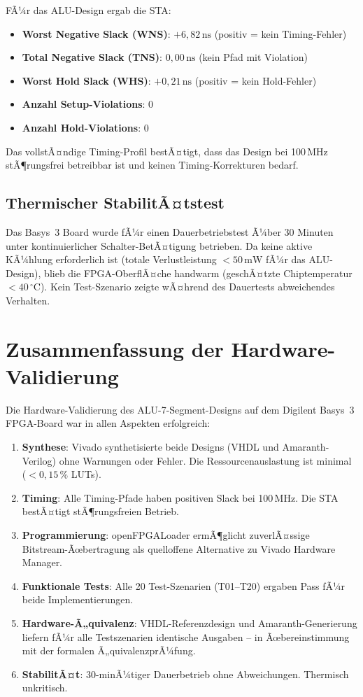 ﻿\documentclass[12pt,a4paper]{report}
\begin{document}
FÃ¼r das ALU-Design ergab die STA:
\begin{itemize}
  \item \textbf{Worst Negative Slack (WNS)}: $+6{,}82\,\text{ns}$ (positiv = kein Timing-Fehler)
  \item \textbf{Total Negative Slack (TNS)}: $0{,}00\,\text{ns}$ (kein Pfad mit Violation)
  \item \textbf{Worst Hold Slack (WHS)}: $+0{,}21\,\text{ns}$ (positiv = kein Hold-Fehler)
  \item \textbf{Anzahl Setup-Violations}: 0
  \item \textbf{Anzahl Hold-Violations}: 0
\end{itemize}

Das vollstÃ¤ndige Timing-Profil bestÃ¤tigt, dass das Design bei 100\,MHz stÃ¶rungsfrei betreibbar ist und keinen Timing-Korrekturen bedarf.

\subsection{Thermischer StabilitÃ¤tstest}
\label{subsec:thermisch}

Das Basys~3 Board wurde fÃ¼r einen Dauerbetriebstest Ã¼ber 30 Minuten unter kontinuierlicher Schalter-BetÃ¤tigung betrieben. Da keine aktive KÃ¼hlung erforderlich ist (totale Verlustleistung $< 50\,\text{mW}$ fÃ¼r das ALU-Design), blieb die FPGA-OberflÃ¤che handwarm (geschÃ¤tzte Chiptemperatur $< 40\,^{\circ}\text{C}$). Kein Test-Szenario zeigte wÃ¤hrend des Dauertests abweichendes Verhalten.

\section{Zusammenfassung der Hardware-Validierung}
\label{sec:hw_zusammenfassung}

Die Hardware-Validierung des ALU-7-Segment-Designs auf dem Digilent Basys~3 FPGA-Board war in allen Aspekten erfolgreich:

\begin{enumerate}
  \item \textbf{Synthese}: Vivado synthetisierte beide Designs (VHDL und Amaranth-Verilog) ohne Warnungen oder Fehler. Die Ressourcenauslastung ist minimal ($< 0{,}15\,\%$ LUTs).
  \item \textbf{Timing}: Alle Timing-Pfade haben positiven Slack bei 100\,MHz. Die STA bestÃ¤tigt stÃ¶rungsfreien Betrieb.
  \item \textbf{Programmierung}: openFPGALoader ermÃ¶glicht zuverlÃ¤ssige Bitstream-Ãœbertra\-gung als quelloffene Alternative zu Vivado Hardware Manager.
  \item \textbf{Funktionale Tests}: Alle 20 Test-Szenarien (T01--T20) ergaben Pass fÃ¼r beide Implementierungen.
  \item \textbf{Hardware-Ã„quivalenz}: VHDL-Referenzdesign und Amaranth-Generierung liefern fÃ¼r alle Testszenarien identische Ausgaben -- in Ãœbereinstimmung mit der formalen Ã„quivalenzprÃ¼fung.
  \item \textbf{StabilitÃ¤t}: 30-minÃ¼tiger Dauerbetrieb ohne Abweichungen. Thermisch unkritisch.
\end{enumerate}
\end{document}
